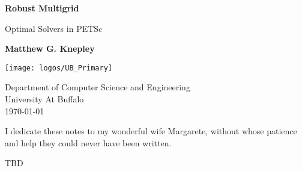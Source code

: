 \documentclass[]{book}
\begin{document}
\begin{titlepage}
    \begin{center}
        \vspace*{1cm}

        \Huge
        \textbf{Robust Multigrid}

        \vspace{2cm}

        \LARGE
        Optimal Solvers in PETSc

        \vspace{3.5cm}

        \Huge
        \textbf{Matthew G. Knepley}

        \vfill

        \vspace{0.8cm}

        \texttt{[image: logos/UB\_Primary]}

        \Large
        Department of Computer Science and Engineering\\
        University At Buffalo\\
        \today

    \end{center}
\end{titlepage}

\thispagestyle{empty}
\null{}
\begin{flushright}
  I dedicate these notes to my wonderful wife Margarete, without whose patience and help they could never have been written.
\end{flushright}
\null

\begin{acknowledgements}
TBD
\end{acknowledgements}


\tableofcontents







\cleardoublepage
{}
\printindex
\end{document}
